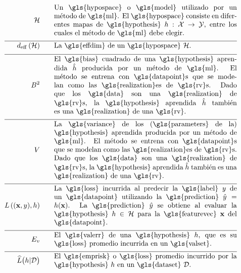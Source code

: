 \begin{align}
	\hypospace  \quad\quad & \parbox{.75\textwidth}{Un \gls{hypospace} o \gls{model} utilizado por un método de \gls{ml}. 
		El \gls{hypospace} consiste en diferentes mapas de \gls{hypothesis} $\hypothesis: \featurespace \rightarrow \labelspace$, entre los cuales 
		el método de \gls{ml} debe elegir.}   \nonumber \\[2mm] \hline \nonumber\\[-5mm]
	\effdim{\hypospace}  \quad\quad & \parbox{.75\textwidth}{La \gls{effdim} de un \gls{hypospace} $\hypospace$.}   \nonumber \\[2mm] \hline \nonumber\\[-5mm]
	\biasterm^2 \quad\quad &\parbox{.75\textwidth}{
		El \gls{bias} cuadrado de una \gls{hypothesis} aprendida $\learnthypothesis$ 
		producida por un método de \gls{ml}. El método se entrena con \gls{datapoint}s 
		que se modelan como las \gls{realization}es de \gls{rv}s. Dado que los \gls{data} son una \gls{realization} 
		de \gls{rv}s, la \gls{hypothesis} aprendida $\learnthypothesis$ también es una \gls{realization} 
		de una \gls{rv}.} \nonumber  \nonumber \\[2mm] \hline \nonumber\\[-5mm]
	\varianceterm \quad\quad &\parbox{.75\textwidth}{La \gls{variance} de los (\gls{parameters} de la) \gls{hypothesis} aprendida 
		producida por un método de \gls{ml}. El método se entrena con \gls{datapoint}s que se modelan como las \gls{realization}es 
		de \gls{rv}s. Dado que los \gls{data} son una \gls{realization} de \gls{rv}s, la \gls{hypothesis} aprendida $\learnthypothesis$ 
		también es una \gls{realization} de una \gls{rv}.} \nonumber \nonumber \\[2mm] \hline \nonumber\\[-5mm]
	\lossfunc{(\featurevec,\truelabel)}{\hypothesis}  \quad\quad & \parbox{.75\textwidth}{La \gls{loss} incurrida al predecir la 
		\gls{label} $\truelabel$ de un \gls{datapoint} utilizando la \gls{prediction} $\hat{\truelabel}=h(\featurevec)$. 
		La \gls{prediction} $\hat{\truelabel}$ se obtiene al evaluar la \gls{hypothesis} $\hypothesis \in \hypospace$ para 
		la \gls{featurevec} $\featurevec$ del \gls{datapoint}.}    \nonumber  \nonumber \\[2mm] \hline \nonumber\\[-5mm] 
	\valerror \quad\quad &\parbox{.75\textwidth}{El \gls{valerr} de una \gls{hypothesis} $\hypothesis$, que es su 
		\gls{loss} promedio incurrida en un \gls{valset}.}  \nonumber \\[2mm] \hline \nonumber\\[-5mm]
	\emperror\big(\hypothesis| \dataset \big) \quad\quad &\parbox{.75\textwidth}{El \gls{emprisk} o \gls{loss} promedio 
		incurrido por la \gls{hypothesis} $\hypothesis$ en un \gls{dataset} $\dataset$.} \nonumber                           
\end{align}     


